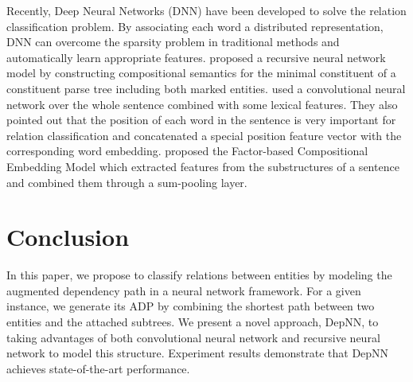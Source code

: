 \documentclass[11pt]{article}
\begin{document}
Recently,  Deep Neural Networks (DNN) have been developed to solve the relation classification problem.
By associating each word a distributed representation, DNN can overcome the sparsity problem in traditional methods and automatically learn appropriate features.  proposed a recursive neural network model by constructing compositional semantics for the minimal constituent of a constituent parse tree including both marked entities.
 used a convolutional neural network over the whole sentence combined with some lexical features. They also pointed out that the position of each word in the sentence is very important for relation classification and concatenated a special position feature vector with the corresponding word embedding.
 proposed the Factor-based Compositional Embedding Model which extracted features from the substructures of a sentence and combined them through a sum-pooling layer.

\section{Conclusion}
In this paper, we propose to classify relations between entities by modeling the augmented dependency path in a neural network framework.
For a given instance, we generate its ADP by combining the shortest path between two entities and the attached subtrees.
We present a novel approach, DepNN, to taking advantages of both convolutional neural network and recursive neural network to model this structure. Experiment results demonstrate that DepNN achieves state-of-the-art performance.




\end{document}
